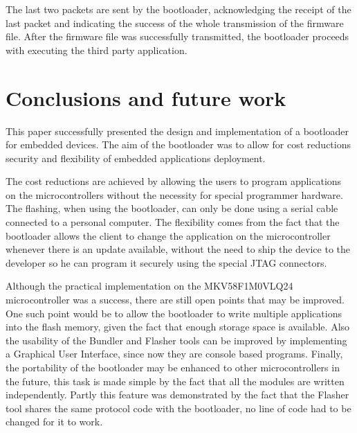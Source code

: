 \documentclass[10pt,a4paper,twoside]{article}
\begin{document}
The last two packets are sent by the bootloader, acknowledging the receipt of the last packet and indicating the success of the whole transmission of the firmware file.
After the firmware file was successfully transmitted, the bootloader proceeds with executing the third party application.

\section{Conclusions and future work}
This paper successfully presented the design and implementation of a bootloader for embedded devices. The aim of the bootloader was to allow for cost reductions security and flexibility of embedded applications deployment.

The cost reductions are achieved by allowing the users to program applications on the microcontrollers without the necessity for special programmer hardware. The flashing, when using the bootloader, can only be done using a serial cable connected to a personal computer. The flexibility comes from the fact that the bootloader allows the client to change the application on the microcontroller whenever there is an update available, without the need to ship the device to the developer so he can program it securely using the special JTAG connectors.

Although the practical implementation on the MKV58F1M0VLQ24 microcontroller was a success, there are still open points that may be improved.
One such point would be to allow the bootloader to write multiple applications into the flash memory, given the fact that enough storage space is available.
Also the usability of the Bundler and Flasher tools can be improved by implementing a Graphical User Interface, since now they are console based programs.
Finally, the portability of the bootloader may be enhanced to other microcontrollers in the future, this task is made simple by the fact that all the modules are written independently. Partly this feature was demonstrated by the fact that the Flasher tool shares the same protocol code with the bootloader, no line of code had to be changed for it to work.
\end{document}
